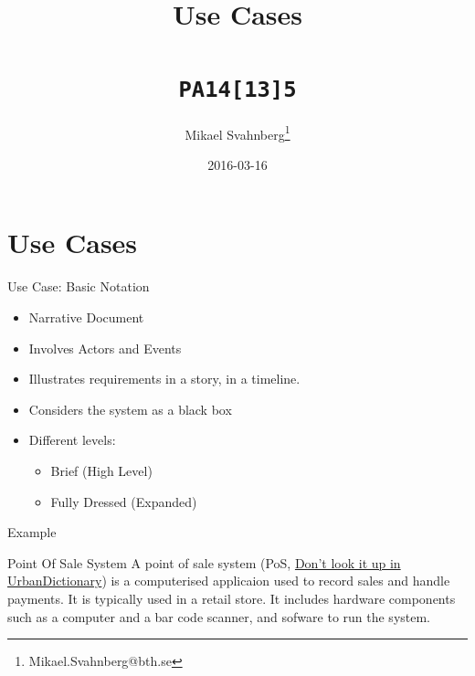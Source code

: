 \documentclass[10pt,t,a4paper]{beamer}
\author{Mikael Svahnberg\thanks{Mikael.Svahnberg@bth.se}}
\date{2016-03-16}
\title{Use Cases \\\\ \texttt{PA14[13]5}}
\begin{document}
\maketitle

\section{Use Cases}
\label{sec-1}
\begin{frame}[label=sec-1-1]{Use Case: Basic Notation}
\begin{itemize}
\item Narrative Document
\item Involves Actors and Events
\item Illustrates requirements in a story, in a timeline.
\item Considers the system as a \alert{black box}

\item Different levels:
\begin{itemize}
\item Brief (High Level)
\item Fully Dressed (Expanded)
\end{itemize}
\end{itemize}
\end{frame}
\begin{frame}[label=sec-1-2]{Example}
\begin{block}{Point Of Sale System}
A point of sale system (PoS, \href{http://www.urbandictionary.com/define.php?term=pos}{Don't look it up in UrbanDictionary}) is a computerised applicaion used to record sales and handle payments. It is typically used in a retail store. It includes hardware components such as a computer and a bar code scanner, and sofware to run the system.
\end{block}
\end{frame}
\end{document}
